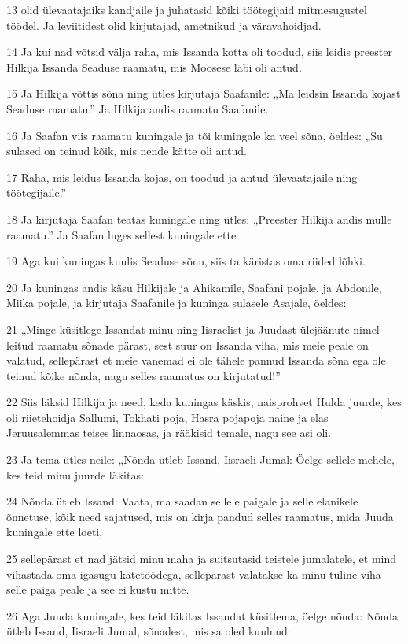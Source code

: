 \par 13 olid ülevaatajaiks kandjaile ja juhatasid kõiki töötegijaid mitmesugustel töödel. Ja leviitidest olid kirjutajad, ametnikud ja väravahoidjad.
\par 14 Ja kui nad võtsid välja raha, mis Issanda kotta oli toodud, siis leidis preester Hilkija Issanda Seaduse raamatu, mis Moosese läbi oli antud.
\par 15 Ja Hilkija võttis sõna ning ütles kirjutaja Saafanile: „Ma leidsin Issanda kojast Seaduse raamatu.” Ja Hilkija andis raamatu Saafanile.
\par 16 Ja Saafan viis raamatu kuningale ja tõi kuningale ka veel sõna, öeldes: „Su sulased on teinud kõik, mis nende kätte oli antud.
\par 17 Raha, mis leidus Issanda kojas, on toodud ja antud ülevaatajaile ning töötegijaile.”
\par 18 Ja kirjutaja Saafan teatas kuningale ning ütles: „Preester Hilkija andis mulle raamatu.” Ja Saafan luges sellest kuningale ette.
\par 19 Aga kui kuningas kuulis Seaduse sõnu, siis ta käristas oma riided lõhki.
\par 20 Ja kuningas andis käsu Hilkijale ja Ahikamile, Saafani pojale, ja Abdonile, Miika pojale, ja kirjutaja Saafanile ja kuninga sulasele Asajale, öeldes:
\par 21 „Minge küsitlege Issandat minu ning Iisraelist ja Juudast ülejäänute nimel leitud raamatu sõnade pärast, sest suur on Issanda viha, mis meie peale on valatud, sellepärast et meie vanemad ei ole tähele pannud Issanda sõna ega ole teinud kõike nõnda, nagu selles raamatus on kirjutatud!”
\par 22 Siis läksid Hilkija ja need, keda kuningas käskis, naisprohvet Hulda juurde, kes oli riietehoidja Sallumi, Tokhati poja, Hasra pojapoja naine ja elas Jeruusalemmas teises linnaosas, ja rääkisid temale, nagu see asi oli.
\par 23 Ja tema ütles neile: „Nõnda ütleb Issand, Iisraeli Jumal: Öelge sellele mehele, kes teid minu juurde läkitas:
\par 24 Nõnda ütleb Issand: Vaata, ma saadan sellele paigale ja selle elanikele õnnetuse, kõik need sajatused, mis on kirja pandud selles raamatus, mida Juuda kuningale ette loeti,
\par 25 sellepärast et nad jätsid minu maha ja suitsutasid teistele jumalatele, et mind vihastada oma igasugu kätetöödega, sellepärast valatakse ka minu tuline viha selle paiga peale ja see ei kustu mitte.
\par 26 Aga Juuda kuningale, kes teid läkitas Issandat küsitlema, öelge nõnda: Nõnda ütleb Issand, Iisraeli Jumal, sõnadest, mis sa oled kuulnud:
